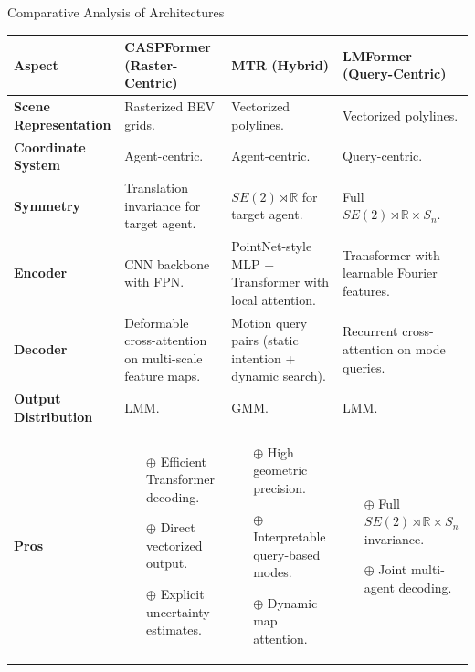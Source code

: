 \documentclass[10pt,aspectratio=169]{beamer}
\newcommand{\greenoplus}{\textcolor{mygreen}{\( \oplus \)}}
\begin{document}
\begin{frame}{Comparative Analysis of Architectures}
\begin{table}[ht]
\centering
\tiny
\renewcommand{\arraystretch}{1.2}
\begin{tabular}{|p{1.9cm}|p{3.9cm}|p{3.9cm}|p{3.9cm}|}
    \hline
    \textbf{Aspect} & \textbf{CASPFormer (Raster-Centric)} & \textbf{MTR (Hybrid)} & \textbf{LMFormer (Query-Centric)} \\
    \hline
    \textbf{Scene Representation} & Rasterized BEV grids. & Vectorized polylines. & Vectorized polylines. \\
    \hline
    \textbf{Coordinate System} & Agent-centric. & Agent-centric. & Query-centric. \\
    \hline
    \textbf{Symmetry} & Translation invariance for target agent. & \(SE(2) \rtimes \mathbb{R} \) for target agent. & Full \(SE(2) \rtimes \mathbb{R} \times S_n\). \\
    \hline
    \textbf{Encoder} & CNN backbone with FPN.  & PointNet-style MLP + Transformer with local attention. & Transformer with learnable Fourier features. \\
    \hline
    \textbf{Decoder} & Deformable cross-attention on multi-scale feature maps. & Motion query pairs (static intention + dynamic search). & Recurrent cross-attention on mode queries. \\
    \hline
    \textbf{Output Distribution} & LMM. & GMM. & LMM. \\
    \hline
    \textbf{Pros} &
    \begin{itemize}
        \item[\greenoplus] Efficient Transformer decoding.
        \item[\greenoplus] Direct vectorized output.
        \item[\greenoplus] Explicit uncertainty estimates.
    \end{itemize} &
    \begin{itemize}
        \item[\greenoplus] High geometric precision.
        \item[\greenoplus] Interpretable query-based modes.
        \item[\greenoplus] Dynamic map attention.
    \end{itemize} &
    \begin{itemize}
        \item[\greenoplus] Full \( SE(2) \rtimes \mathbb{R} \times S_n\) invariance.
        \item[\greenoplus] Joint multi-agent decoding.

\end{itemize}
\end{tabular}
\end{table}
\end{frame}
\end{document}
